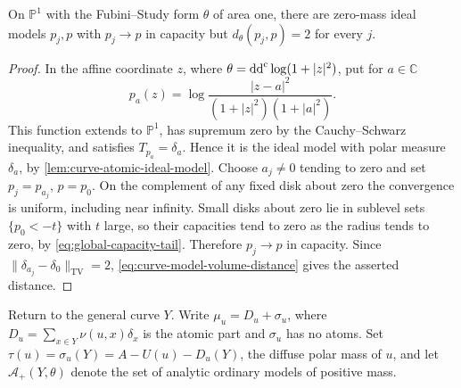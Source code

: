 \begin{example}\label{ex:moving-pole-capacity-not-variation}
On $\mathbb P^1$ with the Fubini--Study form $\theta$ of area one, there are zero-mass ideal models $p_j,p$ with $p_j\to p$ in capacity but $d_\theta(p_j,p)=2$ for every $j$.
\end{example}
\begin{proof}
In the affine coordinate $z$, where $\theta=\mathrm{dd}^{\mathrm{c}}\log(1+|z|^2)$, put for $a\in\mathbb C$
\[
 p_a(z)=\log\frac{|z-a|^2}{(1+|z|^2)(1+|a|^2)}.
\]
This function extends to $\mathbb P^1$, has supremum zero by the Cauchy--Schwarz inequality, and satisfies $T_{p_a}=\delta_a$. Hence it is the ideal model with polar measure $\delta_a$, by \cref{lem:curve-atomic-ideal-model}. Choose $a_j\ne0$ tending to zero and set $p_j=p_{a_j}$, $p=p_0$. On the complement of any fixed disk about zero the convergence is uniform, including near infinity. Small disks about zero lie in sublevel sets $\{p_0<-t\}$ with $t$ large, so their capacities tend to zero as the radius tends to zero, by \eqref{eq:global-capacity-tail}. Therefore $p_j\to p$ in capacity. Since $\|\delta_{a_j}-\delta_0\|_{\mathrm{TV}}=2$, \eqref{eq:curve-model-volume-distance} gives the asserted distance.
\end{proof}

Return to the general curve $Y$. Write $\mu_u=D_u+\sigma_u$, where $D_u=\sum_{x\in Y}\nu(u,x)\delta_x$ is the atomic part and $\sigma_u$ has no atoms. Set $\tau(u)=\sigma_u(Y)=A-U(u)-D_u(Y)$, the diffuse polar mass of $u$, and let $\mathcal A_+(Y,\theta)$ denote the set of analytic ordinary models of positive mass.

